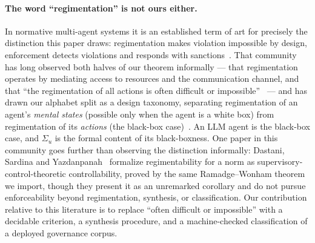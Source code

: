 \documentclass[11pt,a4paper]{article}  \usepackage{mdframed} \usepackage{graphicx}
\begin{document}
\paragraph{The word ``regimentation'' is not ours either.} In normative multi-agent systems it is an established term of art
for precisely the distinction this paper draws: regimentation makes violation impossible by design, enforcement detects
violations and responds with sanctions~\cite{gad06}. That community has long observed both halves of our theorem informally
--- that regimentation operates by mediating access to resources and the communication channel, and that ``the regimentation
of all actions is often difficult or impossible''~\cite{cs16} --- and has drawn our alphabet split as a design taxonomy,
separating regimentation of an agent's \emph{mental states} (possible only when the agent is a white box) from regimentation
of its \emph{actions} (the black-box case)~\cite{balke09}. An LLM agent is the black-box case, and $\Sigma_u$ is the formal
content of its black-boxness. One paper in this community goes further than observing the distinction informally: Dastani,
Sardina and Yazdanpanah~\cite{dsy17} formalize regimentability for a norm as supervisory-control-theoretic controllability,
proved by the same Ramadge--Wonham theorem we import, though they present it as an unremarked corollary and do not pursue
enforceability beyond regimentation, synthesis, or classification. Our contribution relative to this literature is to
replace ``often difficult or impossible'' with a decidable criterion, a synthesis procedure, and a machine-checked
classification of a deployed governance corpus.
\end{document}
